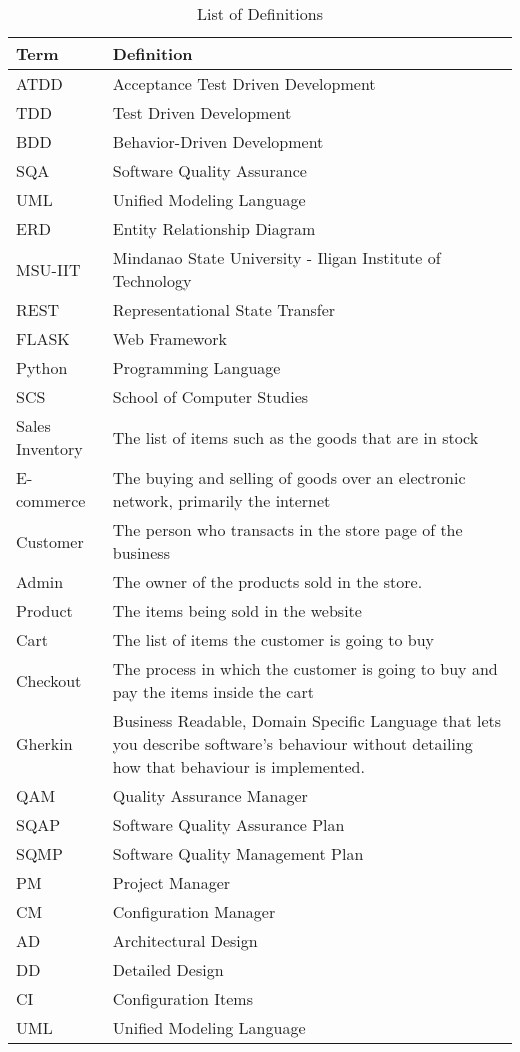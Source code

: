 \documentclass[12pt,letterpaper, margin=1in]{article}
\begin{document}
\begin{table}[ht]
\centering
\begin{adjustbox}{width=1\textwidth,center=\textwidth}
\small
\begin{tabular}{| l | l |}
\hline
\textbf{Term} & \textbf{Definition} \\
\hline
ATDD & Acceptance Test Driven Development \\
TDD & Test Driven Development \\
BDD & Behavior-Driven Development \\
SQA & Software Quality Assurance \\
UML & Unified Modeling Language \\
ERD & Entity Relationship Diagram \\
MSU-IIT & Mindanao State University - Iligan Institute of Technology \\
REST & Representational State Transfer \\
FLASK & Web Framework \\
Python & Programming Language \\
SCS & School of Computer Studies \\ 
Sales Inventory & The list of items such as the goods that are in stock \\
E-commerce & The buying and selling of goods over an electronic network, primarily the internet \\
Customer & The person who transacts in the store page of the business \\
Admin & The owner of the products sold in the store. \\
Product & The items being sold in the website \\
Cart & The list of items the customer is going to buy \\
Checkout & The process in which the customer is going to buy and pay the items inside the cart \\
Gherkin & Business Readable, Domain Specific Language that lets you describe software’s behaviour without detailing how that behaviour is implemented. \\
QAM & Quality Assurance Manager \\
SQAP & Software Quality Assurance Plan \\
SQMP & Software Quality Management Plan \\
PM & Project Manager \\
CM & Configuration Manager \\
AD & Architectural Design \\
DD & Detailed Design \\ 
CI & Configuration Items \\
UML & Unified Modeling Language \\
\hline
\end{tabular}
\end{adjustbox}
\caption{List of Definitions} 
\end{table}
\end{document}
